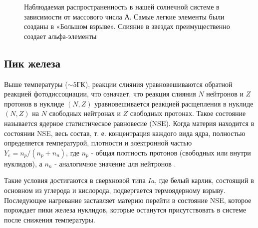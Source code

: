 \documentclass[14pt, a4paper]{article}
\numberwithin{figure}{section}
\numberwithin{equation}{section}
\begin{document}
\begin{figure}[ht]
	\caption{Наблюдаемая распространенность в нашей солнечной системе в зависимости от массового числа А. Самые легкие элементы были созданы в «Большом взрыве». Слияние в звездах преимущественно создает альфа-элементы \cite{abundancies}}
	\label{ris:abundancies}
\end{figure}

\subsection{Пик железа}

Выше температуры ($\sim5\text{ГК}$), реакции слияния уравновешиваются обратной реакцией фотодиссоциации, что означает, что реакция слияния $N$ нейтронов и $Z$ протонов в нуклиде $(N, Z)$ уравновешивается реакцией расщепления в нуклиде $(N, Z)$ на $N$ свободных нейтронах и $Z$ свободных протонах. Такое состояние называется ядерное статистическое равновесие (NSE). Когда материя находится в состоянии NSE, весь состав, т. е. концентрация каждого вида ядра, полностью определяется температурой, плотности и электронной частью $Y_e = n_p/(n_p + n_n)$, где $n_p$ - общая плотность протонов (свободных или внутри нуклидов), а $n_n$ - аналогичное значение для нейтронов \cite{nse}.

Такие условия достигаются в сверхновой типа $Ia$, где белый карлик, состоящий в основном из углерода и кислорода, подвергается термоядерному взрыву. Последующее нагревание заставляет материю перейти в состояние NSE, которое порождает пики железа нуклидов, которые останутся присутствовать в системе после снижения температуры.
\end{document}
